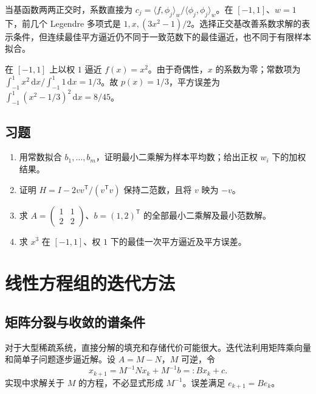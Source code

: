 \documentclass[UTF8,12pt,a4paper,fontset=fandol]{ctexbook}
\begin{document}
当基函数两两正交时，系数直接为 $c_j=\langle f,\phi_j\rangle_w/\langle\phi_j,\phi_j\rangle_w$。在 $[-1,1]$、$w=1$ 下，前几个 Legendre 多项式是 $1,x,(3x^2-1)/2$。选择正交基改善系数求解的表示条件，但连续最佳平方逼近仍不同于一致范数下的最佳逼近，也不同于有限样本拟合。

\begin{example}[平方函数的最佳一次平方逼近]
在 $[-1,1]$ 上以权 $1$ 逼近 $f(x)=x^2$。由于奇偶性，$x$ 的系数为零；常数项为 $\int_{-1}^1x^2\,\mathrm dx/\int_{-1}^1 1\,\mathrm dx=1/3$。故 $p(x)=1/3$，平方误差为 $\int_{-1}^1(x^2-1/3)^2\,\mathrm dx=8/45$。
\end{example}

\section{习题}
\begin{enumerate}[label=\arabic*.]
\item\label{exr:na-ls-constant} 用常数拟合 $b_1,\ldots,b_m$，证明最小二乘解为样本平均数；给出正权 $w_i$ 下的加权结果。
\item\label{exr:na-ls-householder} 证明 $H=I-2vv^{\mathsf T}/(v^{\mathsf T}v)$ 保持二范数，且将 $v$ 映为 $-v$。
\item\label{exr:na-ls-rank} 求 $A=\begin{pmatrix}1&1\\2&2\end{pmatrix}$、$b=(1,2)^{\mathsf T}$ 的全部最小二乘解及最小范数解。
\item\label{exr:na-ls-projection} 求 $x^3$ 在 $[-1,1]$、权 $1$ 下的最佳一次平方逼近及平方误差。
\end{enumerate}

\chapter{线性方程组的迭代方法}
\label{chap:na-iterative}

\section{矩阵分裂与收敛的谱条件}
对于大型稀疏系统，直接分解的填充和存储代价可能很大。迭代法利用矩阵乘向量和简单子问题逐步逼近解。设 $A=M-N$，$M$ 可逆，令
\begin{equation}
 x_{k+1}=M^{-1}Nx_k+M^{-1}b=:Bx_k+c.
 \label{eq:na-stationary}
\end{equation}
实现中求解关于 $M$ 的方程，不必显式形成 $M^{-1}$。误差满足 $e_{k+1}=Be_k$。
\end{document}
